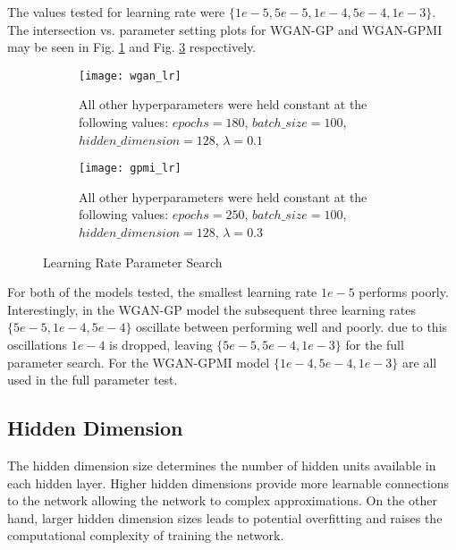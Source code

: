 The values tested for learning rate were $\{1e-5, 5e-5, 1e-4, 5e-4, 1e-3\}$. The intersection vs. parameter setting plots for WGAN-GP and WGAN-GPMI may be seen in Fig. \ref{fig:wgan_lr} and Fig. \ref{fig:gpmi_lr} respectively.

\begin{figure}[!htbp]
	\centering
	\begin{subfigure}{.7\textwidth}
		\texttt{[image: wgan\_lr]}
	\end{subfigure}%
	\begin{subfigure}{.3\textwidth}
		\caption{
			All other hyperparameters were held constant at the following values: $epochs=180$, $batch\_size = 100$, $hidden\_dimension=128$, $\lambda=0.1$
		}
		\label{fig:wgan_lr}
	\end{subfigure}%

	\begin{subfigure}{.7\textwidth}
		\texttt{[image: gpmi\_lr]}
	\end{subfigure}%
	\begin{subfigure}{.3\textwidth}
		\caption{
			All other hyperparameters were held constant at the following values: $epochs=250$, $batch\_size=100$, $hidden\_dimension=128$, $\lambda=0.3$
		}
		\label{fig:gpmi_lr}
	\end{subfigure}%
	\caption{Learning Rate Parameter Search}
\end{figure}

For both of the models tested, the smallest learning rate $1e-5$ performs poorly. Interestingly, in the WGAN-GP model the subsequent three learning rates $\{5e-5,1e-4,5e-4\}$ oscillate between performing well and poorly. due to this oscillations $1e-4$ is dropped, leaving $\{5e-5,5e-4,1e-3\}$ for the full parameter search. For the WGAN-GPMI model $\{1e-4, 5e-4, 1e-3\}$ are all used in the full parameter test.


\subsection{Hidden Dimension}
\label{sec:hdim}

The hidden dimension size determines the number of hidden units available in each hidden layer. Higher hidden dimensions provide more learnable connections to the network allowing the network to complex approximations. On the other hand, larger hidden dimension sizes leads to potential overfitting and raises the computational complexity of training the network.

